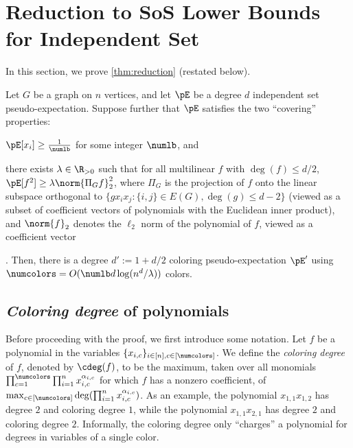 \section{Reduction to SoS Lower Bounds for Independent Set}
\label{sec:mainanalysis}

In this section, we prove \cref{thm:reduction} (restated below).

\begin{theorem*}
Let $G$ be a graph on $n$ vertices, and let $\pE$ be a degree $d$ independent set pseudo-expectation. Suppose further that $\pE$ satisfies the two ``covering'' properties: \begin{inparaenum}[(1)] \item $\pE[x_i] \geq \frac{1}{\numlb}$ for some integer $\numlb$, and \item there exists $\lambda \in \R_{> 0}$ such that for all multilinear $f$ with $\deg(f) \leq d/2$, $\pE[f^2] \geq \lambda \norm{\Pi_G f}_2^2$, where $\Pi_G$ is the projection of $f$ onto the linear subspace orthogonal to $\{g x_i x_j : \{i,j\} \in E(G), \deg(g) \leq d-2\}$ (viewed as a subset of coefficient vectors of polynomials with the Euclidean inner product), and $\norm{f}_2$ denotes the $\ell_2$ norm of the polynomial of $f$, viewed as a coefficient vector\end{inparaenum}. 
Then, there is a degree $d' := 1 + d/2$ coloring pseudo-expectation $\pE'$ using $\numcolors = O(\numlb d \log (n^d/\lambda))$ colors.
\end{theorem*}



\subsection{\emph{Coloring degree} of polynomials}
Before proceeding with the proof, we first introduce some notation. Let $f$ be a polynomial in the variables $\{x_{i,c}\}_{i \in [n], c \in [\numcolors]}$. We define the \emph{coloring degree} of $f$, denoted by $\cdeg(f)$, to be the maximum, taken over all monomials $\prod_{c = 1}^{\numcolors} \prod_{i = 1}^n x_{i,c}^{\alpha_{i,c}}$ for which $f$ has a nonzero coefficient, of $\max_{c \in [\numcolors]} \deg(\prod_{i = 1}^n x_{i,c}^{\alpha_{i,c}})$. As an example, the polynomial $x_{1,1} x_{1,2}$ has degree $2$ and coloring degree $1$, while the polynomial $x_{1,1} x_{2,1}$ has degree $2$ and coloring degree $2$. Informally, the coloring degree only ``charges'' a polynomial for degrees in variables of a single color. 

